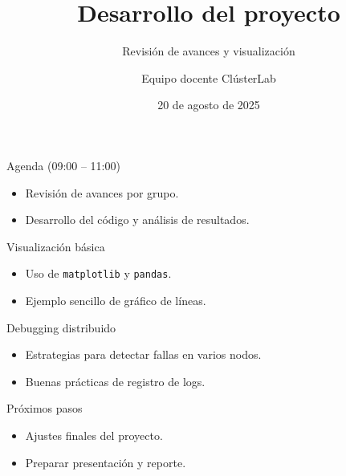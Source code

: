 \documentclass[aspectratio=169,professionalfonts]{beamer}
\title[Cl\'usterLab \bullet{} D\'ia 7]{Desarrollo del proyecto}
\subtitle{Revisi\'on de avances y visualizaci\'on}
\author{Equipo docente Cl\'usterLab}
\date{20 de agosto de 2025}
\begin{document}
\begin{frame}[plain]
  \titlepage
\end{frame}

\begin{frame}{Agenda (09:00 -- 11:00)}
  \begin{itemize}
    \item Revisi\'on de avances por grupo.
    \item Desarrollo del c\'odigo y an\'alisis de resultados.
  \end{itemize}
\end{frame}

\begin{frame}[fragile]{Visualizaci\'on b\'asica}
  \begin{itemize}
    \item Uso de \texttt{matplotlib} y \texttt{pandas}.
    \item Ejemplo sencillo de gr\'afico de l\'ineas.
  \end{itemize}
\end{frame}

\begin{frame}[fragile]{Debugging distribuido}
  \begin{itemize}
    \item Estrategias para detectar fallas en varios nodos.
    \item Buenas pr\'acticas de registro de logs.
  \end{itemize}
\end{frame}

\begin{frame}{Pr\'oximos pasos}
  \begin{itemize}
    \item Ajustes finales del proyecto.
    \item Preparar presentaci\'on y reporte.
  \end{itemize}
\end{frame}
\end{document}
